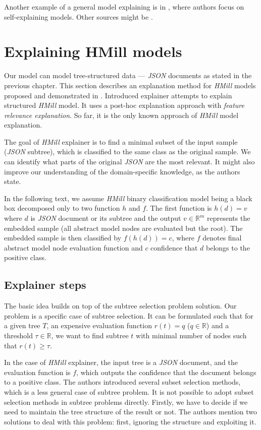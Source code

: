 Another example of a general model explaining is in \cite{Alvarez-Melis2018}, where authors focus on self-explaining models. Other sources might be \cite{Strumbelj2013,Robnik-Sikonja2008,Montavon2018}.

\section{Explaining HMill models}
Our model can model tree-structured data --- \emph{JSON} documents as stated in the previous chapter. This section describes an explanation method for \emph{HMill} models proposed and demonstrated in \cite{Pevny2020}. Introduced explainer attempts to explain structured \emph{HMill} model. It uses a post-hoc explanation approach with \emph{feature relevance explanation}. So far, it is the only known approach of \emph{HMill} model explanation.

The goal of \emph{HMill} explainer is to find a minimal subset of the input sample (\emph{JSON} subtree), which is classified to the same class as the original sample. We can identify what parts of the original \emph{JSON} are the most relevant. It might also improve our understanding of the domain-specific knowledge, as the authors state.

In the following text, we assume \emph{HMill} binary classification model being a black box decomposed only to two function $h$ and $f$. The first function is $h(d)=v$ where $d$ is \emph{JSON} document or its subtree and the output $v\in\mathbb{R}^{m}$ represents the embedded sample (all abstract model nodes are evaluated but the root). The embedded sample is then classified by $f(h(d))=c$, where $f$ denotes final abstract model node evaluation function and $c$ confidence that $d$ belongs to the positive class.

\subsection{Explainer steps}
The basic idea builds on top of the subtree selection problem solution. Our problem is a specific case of subtree selection. It can be formulated such that for a given tree $T$, an expensive evaluation function $r(t)=q$ ($q\in\mathbb{R}$) and a threshold $\tau\in\mathbb{R}$, we want to find subtree $t$ with minimal number of nodes such that $r(t)\geq\tau$. 

In the case of \emph{HMill} explainer, the input tree is a \emph{JSON} document, and the evaluation function is $f$, which outputs the confidence that the document belongs to a positive class. The authors introduced several subset selection methods, which is a less general case of subtree problem. It is not possible to adopt subset selection methods in subtree problems directly. Firstly, we have to decide if we need to maintain the tree structure of the result or not. The authors mention two solutions to deal with this problem: first, ignoring the structure and exploiting it.

